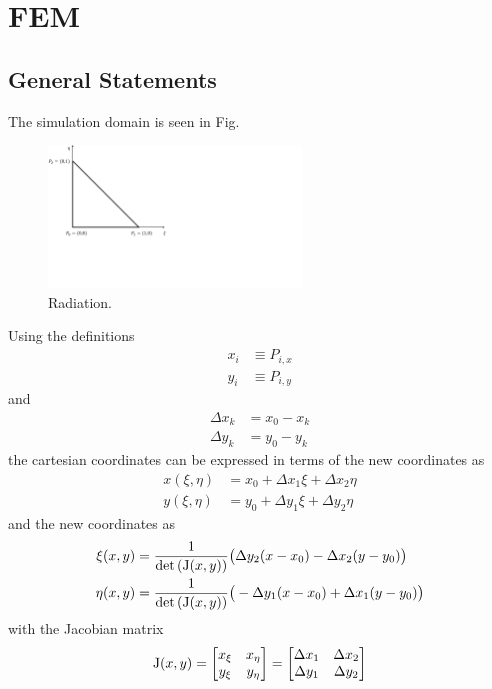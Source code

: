 \chapter{FEM}

\section{General Statements}
The simulation domain is seen in Fig.
\begin{figure}[H]
	\centering
	\includegraphics[trim= 0cm 7cm 18cm 0cm ,clip,width=0.6\textwidth]{figures/FEM_triangle.png}
	\caption{Radiation.}
	\label{fig:FEM_domain}
\end{figure}
Using the definitions
\begin{align}
	x_i &\equiv P_{i,x} \\
	y_i &\equiv P_{i,y}
\end{align}
and
\begin{align}
	\Delta x_k &= x_0 - x_k\\
	\Delta y_k &= y_0 - y_k
\end{align}
the cartesian coordinates can be expressed in terms of the new coordinates as
\begin{align}
	x(\xi, \eta) &= x_0 + \Delta x_1 \xi + \Delta x_2 \eta\\
	y(\xi, \eta) &= y_0 + \Delta y_1 \xi + \Delta y_2 \eta
\end{align}
and the new coordinates as
\begin{align}
	\xi(x, y) & = \frac{1}{\det\left(\mathrm{J}(x,y) \right)} \big(\Delta y_2 (x - x_0) - \Delta x_2 (y - y_0) \big)\\
	\eta(x, y) & = \frac{1}{\det\left(\mathrm{J}(x,y) \right)} \big(-\Delta y_1 (x - x_0) + \Delta x_1(y - y_0) \big)
\end{align}
with the Jacobian matrix
\begin{equation}
	\mathrm{J}(x,y) =
	\begin{bmatrix}
	x_{\xi} & x_{\eta} \\
	y_{\xi} & y_{\eta}
	\end{bmatrix}
	=
	\begin{bmatrix}
	\Delta x_{1} & \Delta x_{2}\\
	\Delta y_{1} & \Delta y_{2}
	\end{bmatrix}
\end{equation}
